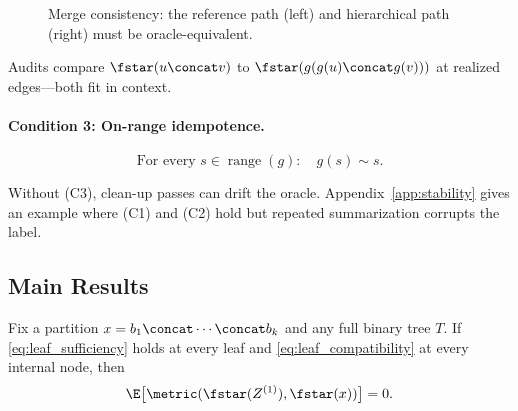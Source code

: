 \begin{figure}[t]
    \centering
    \caption{Merge consistency: the reference path (left) and hierarchical path (right) must be oracle-equivalent.}
    \label{fig:local_compatibility}
\end{figure}

\begin{remark}\label{rem:edgewise}
Audits compare $\fstar(u \concat v)$ to $\fstar(g(g(u) \concat g(v)))$ at realized edges---both fit in context.
\end{remark}

\paragraph{Condition 3: On-range idempotence.}
\begin{equation}\tag{C3}\label{eq:leaf_idempotence}
\text{For every } s \in \operatorname{range}(g): \quad g(s) \sim s.
\end{equation}

Without (C3), clean-up passes can drift the oracle. Appendix~\ref{app:stability} gives an example where (C1) and (C2) hold but repeated summarization corrupts the label.

\subsection{Main Results}

\begin{theorem}\label{thm:one-pass}
Fix a partition $x = b_1 \concat \cdots \concat b_k$ and any full binary tree $T$. If \eqref{eq:leaf_sufficiency} holds at every leaf and \eqref{eq:leaf_compatibility} at every internal node, then
\[
\E\big[\metric(\fstar(Z^{(1)}), \fstar(x))\big] = 0.
\]
\end{theorem}

